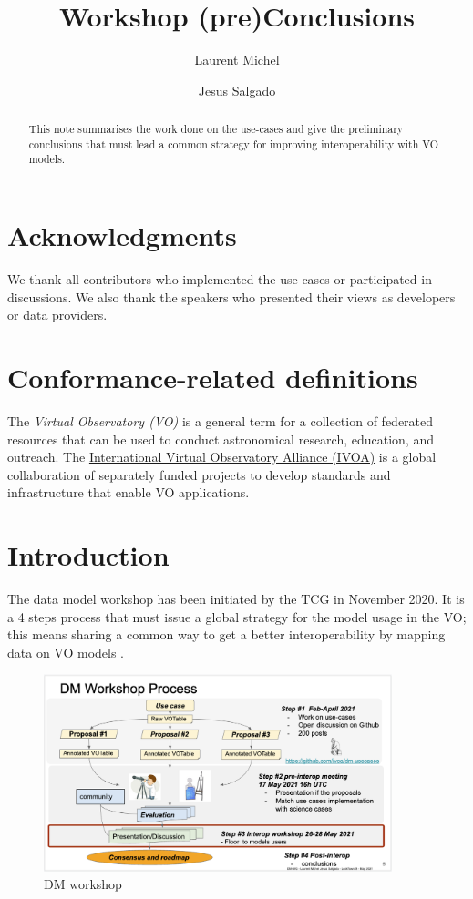 \documentclass[11pt,a4paper]{ivoa}
\title{Workshop (pre)Conclusions}
\author{Laurent Michel}
\author{Jesus Salgado}
\begin{document}
\begin{abstract}
This note summarises the work done on the use-cases and give the preliminary conclusions that must lead a common strategy for improving interoperability with VO models.
\end{abstract}


\section*{Acknowledgments}

We thank all contributors who implemented the use cases or participated in discussions. 
We also thank the speakers who presented their views as developers or data providers.

\section*{Conformance-related definitions}

The \emph{Virtual Observatory (VO)} is a
general term for a collection of federated resources that can be used
to conduct astronomical research, education, and outreach.
The \href{https://www.ivoa.net}{International
Virtual Observatory Alliance (IVOA)} is a global
collaboration of separately funded projects to develop standards and
infrastructure that enable VO applications.

\section{Introduction}

The data model workshop has been initiated by the TCG in November 2020.
It is a 4 steps process that must issue a global strategy for the model usage in the VO; this means sharing a common way to get a better interoperability by mapping data on VO models .

\begin{figure}
\centering

\includegraphics[width=0.9\textwidth]{fig1.png}
\caption{DM workshop}
\label{fig:workshop}
\end{figure}
\end{document}
